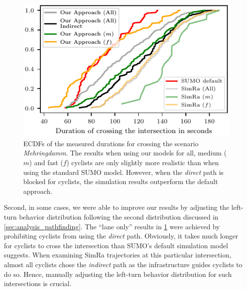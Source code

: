 \begin{figure}[t]
    \centering
    \includegraphics[width=\columnwidth]{fig/im_mehringdamm_ecdf_every.pdf}
    \caption{%
        ECDFs of the measured durations for crossing the scenario \textit{Mehringdamm}.
        The results when using our models for all, medium ($m$) and fast ($f$) cyclists are only slightly more realistic than when using the standard SUMO model.
        However, when the \textit{direct} path is blocked for cyclists, the simulation results outperform the default approach.
    }%
    \label{fig:im_mehringdamm}
\end{figure}

Second, in some cases, we were able to improve our results by adjusting the left-turn behavior distribution following the second distribution discussed in \cref{sec:analysis_pathfinding}.
The ``lane only'' results in \cref{fig:im_mehringdamm} were achieved by prohibiting cyclists from using the \textit{direct} path.
Obviously, it takes much longer for cyclists to cross the intersection than SUMO's default simulation model suggests.
When examining SimRa trajectories at this particular intersection, almost all cyclists chose the \textit{indirect} path as the infrastructure guides cyclists to do so.
Hence, manually adjusting the left-turn behavior distribution for such intersections is crucial.

